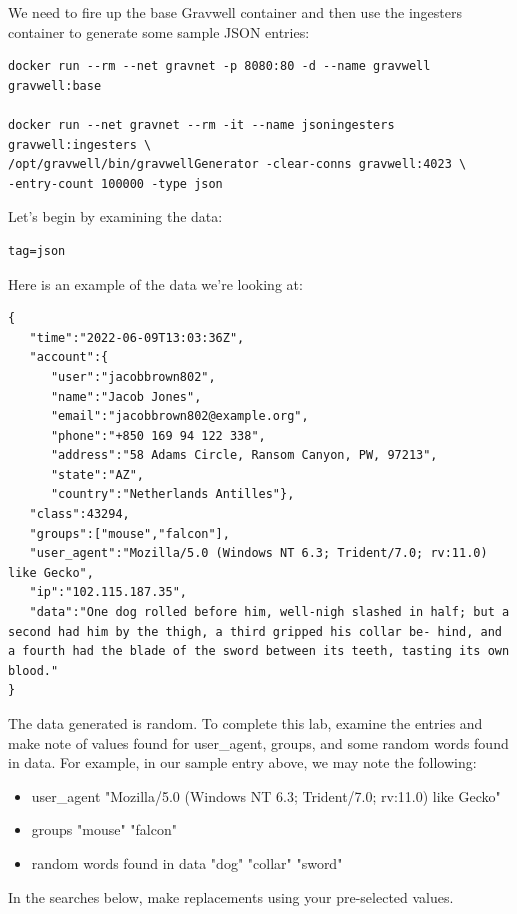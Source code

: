 We need to fire up the base Gravwell container and then use the ingesters
container to generate some sample JSON entries:

\begin{Verbatim}[breaklines=true]
docker run --rm --net gravnet -p 8080:80 -d --name gravwell gravwell:base

docker run --net gravnet --rm -it --name jsoningesters gravwell:ingesters \
/opt/gravwell/bin/gravwellGenerator -clear-conns gravwell:4023 \
-entry-count 100000 -type json
\end{Verbatim}

Let's begin by examining the data:

\begin{Verbatim}
tag=json
\end{Verbatim}

Here is an example of the data we're looking at:

\begin{Verbatim}[breaklines=true]
{
   "time":"2022-06-09T13:03:36Z",
   "account":{
      "user":"jacobbrown802",
      "name":"Jacob Jones",
      "email":"jacobbrown802@example.org",
      "phone":"+850 169 94 122 338",
      "address":"58 Adams Circle, Ransom Canyon, PW, 97213",
      "state":"AZ",
      "country":"Netherlands Antilles"},
   "class":43294,
   "groups":["mouse","falcon"],
   "user_agent":"Mozilla/5.0 (Windows NT 6.3; Trident/7.0; rv:11.0) like Gecko",
   "ip":"102.115.187.35",
   "data":"One dog rolled before him, well-nigh slashed in half; but a second had him by the thigh, a third gripped his collar be- hind, and a fourth had the blade of the sword between its teeth, tasting its own blood."
}
\end{Verbatim}

The data generated is random. To complete this lab, examine the entries and make note of values found for user\_agent, groups, and some random words found in data.
For example, in our sample entry above, we may note the following:
\begin{itemize}
\item user\_agent
\subitem "Mozilla/5.0 (Windows NT 6.3; Trident/7.0; rv:11.0) like Gecko"
\item groups
\subitem "mouse"
\subitem "falcon"
\item random words found in data
\subitem "dog"
\subitem "collar"
\subitem "sword"
\end{itemize}

In the searches below, make replacements using your pre-selected values.

